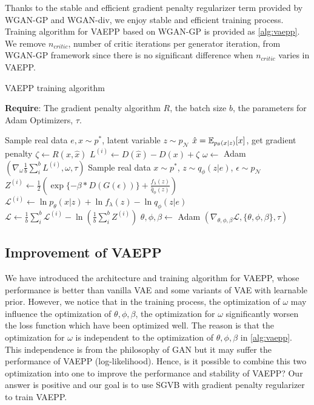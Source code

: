 Thanks to the stable and efficient gradient penalty regularizer term provided by WGAN-GP and WGAN-div, we enjoy stable and efficient training process. Training algorithm for VAEPP based on WGAN-GP is provided as \cref{alg:vaepp}. We remove $n_{critic}$, number of critic iterations per generator iteration, from WGAN-GP framework since there is no significant difference when $n_{critic}$ varies in VAEPP.
\begin{algorithm}[tb]
\caption{VAEPP training algorithm}
\label{alg:vaepp}
\textbf{Require}: The gradient penalty algorithm $R$, the batch size $b$, the parameters for Adam Optimizers, $\tau$. 

\begin{algorithmic}[1] %
\STATE Sample real data $e, x \sim p^*$, latent variable $z \sim p_\mathcal{N}$
\STATE	$\hat{x} = \operatorname{\mathbb{E}}_{p_\theta(x|z)}[x]$, get gradient penalty $\zeta \gets R(x, \hat{x})$
\STATE $L^{(i)} \gets D(\hat{x}) - D(x) + \zeta$
\ENDFOR
\STATE $\omega \gets $ Adam $(\nabla_{\omega} \frac{1}{b}\sum_{i}^b L^{(i)}, \omega, \tau)$
\STATE Sample real data $x \sim p^*$, $z \sim q_\phi(z|e)$, $\epsilon \sim p_\mathcal{N}$
\STATE $Z^{(i)} \gets \frac{1}{2}(\exp\{-\beta * D(G(\epsilon))\} + \frac{f_\lambda(z)}{\hat{q}_\phi(z)})$
\STATE $\mathcal{L}^{(i)} \gets \ln p_\theta(x|z) + \ln f_\lambda(z) - \ln q_\phi(z|e)$
\ENDFOR
\STATE $\mathcal{L} \gets \frac{1}{b}\sum_{i}^b \mathcal{L}^{(i)} - \ln (\frac{1}{b}\sum_{i}^b Z^{(i)})$
\STATE $\theta, \phi, \beta \gets $ Adam $(\nabla_{\theta, \phi, \beta} \mathcal{L}, \{\theta, \phi, \beta\}, \tau)$
\ENDWHILE
\end{algorithmic}
\end{algorithm}
\subsection{Improvement of VAEPP} \label{subsec:improve_of_vaepp}
We have introduced the architecture and training algorithm for VAEPP, whose performance is better than vanilla VAE and some variants of VAE with learnable prior. However, we notice that in the training process, the optimization of $\omega$ may influence the optimization of $\theta, \phi, \beta$, \EG the optimization for $\omega$ significantly worsen the loss function which have been optimized well. The reason is that the optimization for $\omega$ is independent to the optimization of $\theta, \phi, \beta$ in \cref{alg:vaepp}. This independence is from the philosophy of GAN but it may suffer the performance of VAEPP (log-likelihood). Hence, is it possible to combine this two optimization into one to improve the performance and stability of VAEPP? Our answer is positive and our goal is to use SGVB with gradient penalty regularizer to train VAEPP. 

